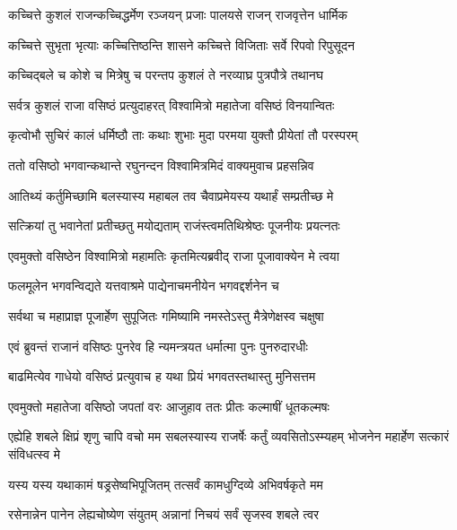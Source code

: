 \twolineshloka
{कच्चित्ते कुशलं राजन्कच्चिद्धर्मेण रञ्जयन्}
{प्रजाः पालयसे राजन् राजवृत्तेन धार्मिक} %

\twolineshloka
{कच्चित्ते सुभृता भृत्याः कच्चित्तिष्ठन्ति शासने}
{कच्चित्ते विजिताः सर्वे रिपवो रिपुसूदन} %

\twolineshloka
{कच्चिद्बले च कोशे च मित्रेषु च परन्तप}
{कुशलं ते नरव्याघ्र पुत्रपौत्रे तथानघ} %

\twolineshloka
{सर्वत्र कुशलं राजा वसिष्ठं प्रत्युदाहरत्}
{विश्वामित्रो महातेजा वसिष्ठं विनयान्वितः} %

\twolineshloka
{कृत्वोभौ सुचिरं कालं धर्मिष्ठौ ताः कथाः शुभाः}
{मुदा परमया युक्तौ प्रीयेतां तौ परस्परम्} %

\twolineshloka
{ततो वसिष्ठो भगवान्कथान्ते रघुनन्दन}
{विश्वामित्रमिदं वाक्यमुवाच प्रहसन्निव} %

\twolineshloka
{आतिथ्यं कर्तुमिच्छामि बलस्यास्य महाबल}
{तव चैवाप्रमेयस्य यथार्हं सम्प्रतीच्छ मे} %

\twolineshloka
{सत्क्रियां तु भवानेतां प्रतीच्छतु मयोद्यताम्}
{राजंस्त्वमतिथिश्रेष्ठः पूजनीयः प्रयत्नतः} %

\twolineshloka
{एवमुक्तो वसिष्ठेन विश्वामित्रो महामतिः}
{कृतमित्यब्रवीद् राजा पूजावाक्येन मे त्वया} %

\twolineshloka
{फलमूलेन भगवन्विद्यते यत्तवाश्रमे}
{पाद्येनाचमनीयेन भगवद्दर्शनेन च} %

\twolineshloka
{सर्वथा च महाप्राज्ञ पूजार्हेण सुपूजितः}
{गमिष्यामि नमस्तेऽस्तु मैत्रेणेक्षस्व चक्षुषा} %

\twolineshloka
{एवं ब्रुवन्तं राजानं वसिष्ठः पुनरेव हि}
{न्यमन्त्रयत धर्मात्मा पुनः पुनरुदारधीः} %

\twolineshloka
{बाढमित्येव गाधेयो वसिष्ठं प्रत्युवाच ह}
{यथा प्रियं भगवतस्तथास्तु मुनिसत्तम} %

\twolineshloka
{एवमुक्तो महातेजा वसिष्ठो जपतां वरः}
{आजुहाव ततः प्रीतः कल्माषीं धूतकल्मषः} %

\threelineshloka
{एह्येहि शबले क्षिप्रं शृणु चापि वचो मम}
{सबलस्यास्य राजर्षेः कर्तुं व्यवसितोऽस्म्यहम्}
{भोजनेन महार्हेण सत्कारं संविधत्स्व मे} %

\twolineshloka
{यस्य यस्य यथाकामं षड्रसेष्वभिपूजितम्}
{तत्सर्वं कामधुग्दिव्ये अभिवर्षकृते मम} %

\twolineshloka
{रसेनान्नेन पानेन लेह्यचोष्येण संयुतम्}
{अन्नानां निचयं सर्वं सृजस्व शबले त्वर} %


